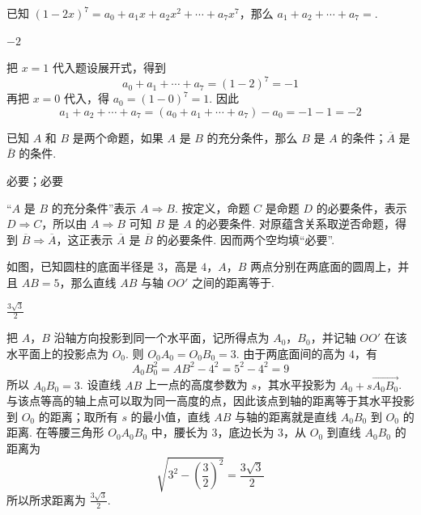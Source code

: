 \begin{problem}
已知 \((1 - 2x)^7 = a_0 + a_1x + a_2x^2 + \cdots + a_7x^7\)，那么 \(a_1 + a_2 + \cdots + a_7 = \)\fillinblank{}.
\end{problem}

\begin{answer}
\(-2\)
\end{answer}

\begin{solution}
把 \(x=1\) 代入题设展开式，得到
\[
a_0+a_1+\cdots+a_7=(1-2)^7=-1
\]
再把 \(x=0\) 代入，得 \(a_0=(1-0)^7=1\). 因此
\[
a_1+a_2+\cdots+a_7=(a_0+a_1+\cdots+a_7)-a_0=-1-1=-2
\]
\end{solution}

\begin{problem}
已知 \(A\) 和 \(B\) 是两个命题，如果 \(A\) 是 \(B\) 的充分条件，那么 \(B\) 是 \(A\) 的\fillinblank{}条件；\(\overline{A}\) 是 \(\overline{B}\) 的\fillinblank{}条件.
\end{problem}

\begin{answer}
必要；必要
\end{answer}

\begin{solution}
“\(A\) 是 \(B\) 的充分条件”表示 \(A\Rightarrow B\). 按定义，命题 \(C\) 是命题 \(D\) 的必要条件，表示 \(D\Rightarrow C\)，所以由 \(A\Rightarrow B\) 可知 \(B\) 是 \(A\) 的必要条件. 对原蕴含关系取逆否命题，得到 \(\overline{B}\Rightarrow\overline{A}\)，这正表示 \(\overline{A}\) 是 \(\overline{B}\) 的必要条件. 因而两个空均填“必要”.
\end{solution}

\begin{problem}
如图，已知圆柱的底面半径是 \(3\)，高是 \(4\)，\(A\)，\(B\) 两点分别在两底面的圆周上，并且 \(AB = 5\)，那么直线 \(AB\) 与轴 \(OO'\) 之间的距离等于\fillinblank{}.

\end{problem}

\begin{answer}
\(\frac{3\sqrt{3}}{2}\)
\end{answer}

\begin{solution}
把 \(A\)，\(B\) 沿轴方向投影到同一个水平面，记所得点为 \(A_0\)，\(B_0\)，并记轴 \(OO'\) 在该水平面上的投影点为 \(O_0\). 则 \(O_0A_0=O_0B_0=3\). 由于两底面间的高为 \(4\)，有
\[
A_0B_0^2=AB^2-4^2=5^2-4^2=9
\]
所以 \(A_0B_0=3\). 设直线 \(AB\) 上一点的高度参数为 \(s\)，其水平投影为 \(A_0+s\overrightarrow{A_0B_0}\). 与该点等高的轴上点可以取为同一高度的点，因此该点到轴的距离等于其水平投影到 \(O_0\) 的距离；取所有 \(s\) 的最小值，直线 \(AB\) 与轴的距离就是直线 \(A_0B_0\) 到 \(O_0\) 的距离. 在等腰三角形 \(O_0A_0B_0\) 中，腰长为 \(3\)，底边长为 \(3\)，从 \(O_0\) 到直线 \(A_0B_0\) 的距离为
\[
\sqrt{3^2-\left(\frac32\right)^2}=\frac{3\sqrt3}{2}
\]
所以所求距离为 \(\frac{3\sqrt3}{2}\).
\end{solution}

